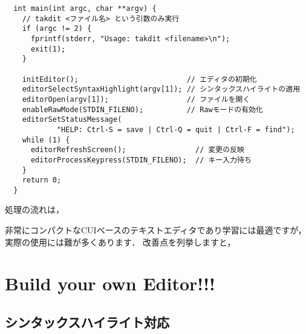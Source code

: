 \begin{verbatim}
  int main(int argc, char **argv) {
    // takdit <ファイル名> という引数のみ実行
    if (argc != 2) {
      fprintf(stderr, "Usage: takdit <filename>\n");
      exit(1);
    }

    initEditor();                         // エディタの初期化
    editorSelectSyntaxHighlight(argv[1]); // シンタックスハイライトの適用
    editorOpen(argv[1]);                  // ファイルを開く
    enableRawMode(STDIN_FILENO);          // Rawモードの有効化
    editorSetStatusMessage(
            "HELP: Ctrl-S = save | Ctrl-Q = quit | Ctrl-F = find");
    while (1) {
      editorRefreshScreen();                // 変更の反映
      editorProcessKeypress(STDIN_FILENO);  // キー入力待ち
    }
    return 0;
  }
\end{verbatim}

処理の流れは，

非常にコンパクトなCUIベースのテキストエディタであり学習には最適ですが，実際の使用には難が多くあります．
改善点を列挙しますと，

\section{Build your own Editor!!!}

\subsection{シンタックスハイライト対応}

